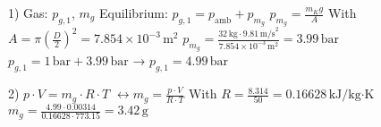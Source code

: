 1) Gas: \( p_{g,1} \), \( m_g \)  
Equilibrium: \( p_{g,1} = p_{\text{amb}} + p_{m_g} \)  
\( p_{m_g} = \frac{m_K g}{A} \)  
With \( A = \pi \left(\frac{D}{2}\right)^2 = 7.854 \times 10^{-3} \, \text{m}^2 \)  
\( p_{m_g} = \frac{32 \, \text{kg} \cdot 9.81 \, \text{m/s}^2}{7.854 \times 10^{-3} \, \text{m}^2} = 3.99 \, \text{bar} \)  
\( p_{g,1} = 1 \, \text{bar} + 3.99 \, \text{bar} \)  
→ \( p_{g,1} = 4.99 \, \text{bar} \)  

2) \( p \cdot V = m_g \cdot R \cdot T \)  
\( \leftrightarrow m_g = \frac{p \cdot V}{R \cdot T} \)  
With \( R = \frac{8.314}{50} = 0.16628 \, \text{kJ/kg·K} \)  
\( m_g = \frac{4.99 \cdot 0.00314}{0.16628 \cdot 773.15} = 3.42 \, \text{g} \)